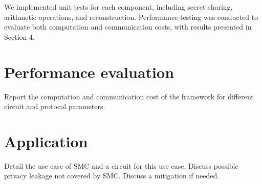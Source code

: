 \documentclass[10pt,conference,compsocconf]{IEEEtran}
\begin{document}
We implemented unit tests for each component, including secret sharing, arithmetic operations, and reconstruction. Performance testing was conducted to evaluate both computation and communication costs, with results presented in Section 4.

\section{Performance evaluation}
Report the computation and communication cost of the framework for different circuit and protocol parameters.

\section{Application}
Detail the use case of SMC and a circuit for this use case. Discuss possible privacy leakage not
covered by SMC. Discuss a mitigation if needed.



\end{document}
